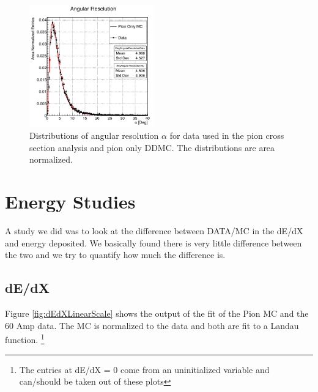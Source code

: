 \begin{figure}[htb]
\centering
\includegraphics[width=0.48\textwidth]{Studies/Figures/cTrackingDeg.png}
\caption[]{Distributions of angular resolution $\alpha$ for data used in the pion cross section analysis and pion only DDMC. The distributions are area normalized. } \label{fig:trackingResolution}
\end{figure}




\section{Energy Studies}

A study we did was to look at the difference between DATA/MC in the dE/dX and energy deposited. We basically found there is very little difference between the two and we try to quantify how much the difference is.

\subsection{dE/dX}
Figure \ref{fig:dEdXLinearScale} shows the output of the fit of the Pion MC and the 60 Amp data. The MC is normalized to the data and both are fit to a Landau function. \footnote{The entries at dE/dX = 0 come from an uninitialized variable and can/should be taken out of these plots}

